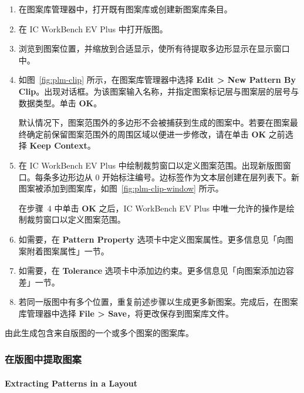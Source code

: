 \begin{enumerate}
  \item 在图案库管理器中，打开既有图案库或创建新图案库条目。
  \item 在 IC WorkBench EV Plus 中打开版图。
  \item 浏览到图案位置，并缩放到合适显示，使所有待提取多边形显示在显示窗口中。
  \item 如图~\ref{fig:plm-clip} 所示，在图案库管理器中选择 \textbf{Edit > New Pattern By Clip}。出现对话框。为该图案输入名称，并指定图案标记层与图案层的层号与数据类型。单击 \textbf{OK}。


\begin{noteBox}
默认情况下，图案范围外的多边形不会被捕获到生成的图案中。若要在图案最终确定前保留图案范围外的周围区域以便进一步修改，请在单击 \textbf{OK} 之前选择 \textbf{Keep Context}。
\end{noteBox}

  \item 在 IC WorkBench EV Plus 中绘制裁剪窗口以定义图案范围。出现新版图窗口。每条多边形边从 0 开始标注编号。边标签作为文本层创建在层列表下。新图案被添加到图案库，如图~\ref{fig:plm-clip-window} 所示。


\begin{noteBox}
在步骤~4 中单击 \textbf{OK} 之后，IC WorkBench EV Plus 中唯一允许的操作是绘制裁剪窗口以定义图案范围。
\end{noteBox}

  \item 如需要，在 \textbf{Pattern Property} 选项卡中定义图案属性。更多信息见「向图案附着图案属性」一节。
  \item 如需要，在 \textbf{Tolerance} 选项卡中添加边约束。更多信息见「向图案添加边容差」一节。
  \item 若同一版图中有多个位置，重复前述步骤以生成更多新图案。完成后，在图案库管理器中选择 \textbf{File > Save}，将更改保存到图案库文件。
\end{enumerate}

由此生成包含来自版图的一个或多个图案的图案库。

\subsubsection{在版图中提取图案}
\paragraph*{Extracting Patterns in a Layout}

